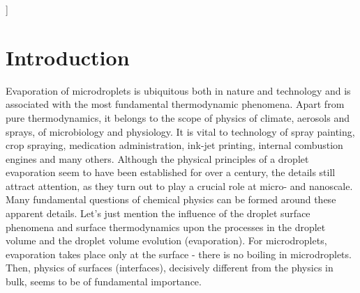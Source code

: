 \documentclass[twoside,twocolumn,9pt]{article}
\begin{document}
  ]

\renewcommand*\rmdefault{bch}\normalfont\upshape
\rmfamily
\section*{}
\vspace{-1cm}










\section{Introduction}
Evaporation of microdroplets is ubiquitous both in nature and technology and is associated with the most fundamental thermodynamic phenomena. Apart from pure thermodynamics, it belongs to the scope of physics of climate, aerosols and sprays, of microbiology and physiology. It is vital to technology of spray painting, crop spraying, medication administration, ink-jet printing, internal combustion engines and many others. Although  the physical principles of a droplet evaporation seem to have been established for over a century, the details still attract attention, as they turn out to play a crucial role at micro- and nanoscale. Many fundamental questions of chemical physics can be formed around these apparent details. Let's just mention the influence of the droplet surface phenomena and surface thermodynamics upon the processes in the droplet volume and the droplet volume evolution (evaporation). For microdroplets, evaporation takes place only at the surface - there is no boiling in microdroplets. Then, physics of surfaces (interfaces), decisively different from the physics in bulk, seems to be of fundamental importance. 
\end{document}

